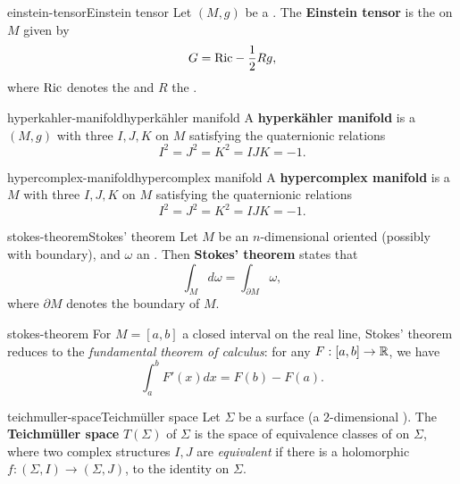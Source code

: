 \begin{topic}{einstein-tensor}{Einstein tensor}
    Let $(M, g)$ be a . The \textbf{Einstein tensor} is the  on $M$ given by
    \[ G = \textup{Ric} - \frac{1}{2} R g , \]
    where $\textup{Ric}$ denotes the  and $R$ the .
\end{topic}

\begin{topic}{hyperkahler-manifold}{hyperkähler manifold}
    A \textbf{hyperkähler manifold} is a  $(M, g)$ with three  $I, J, K$ on $M$ satisfying the quaternionic relations
    \[ I^2 = J^2 = K^2 = IJK = -1 . \]
\end{topic}

\begin{topic}{hypercomplex-manifold}{hypercomplex manifold}
    A \textbf{hypercomplex manifold} is a  $M$ with three  $I, J, K$ on $M$ satisfying the quaternionic relations
    \[ I^2 = J^2 = K^2 = IJK = -1 . \]
\end{topic}

\begin{topic}{stokes-theorem}{Stokes' theorem}
    Let $M$ be an $n$-dimensional oriented   (possibly with boundary), and $\omega$ an . Then \textbf{Stokes' theorem} states that
    \[ \int_M d \omega = \int_{\partial M} \omega , \]
    where $\partial M$ denotes the boundary of $M$.
\end{topic}

\begin{example}{stokes-theorem}
    For $M = [a, b]$ a closed interval on the real line, Stokes' theorem reduces to the \textit{fundamental theorem of calculus}: for any $F : [a, b] \to \mathbb{R}$, we have
    \[ \int_a^b F'(x) dx = F(b) - F(a) . \]
\end{example}

\begin{topic}{teichmuller-space}{Teichmüller space}
    Let $\Sigma$ be a surface (a $2$-dimensional ). The \textbf{Teichmüller space} $T(\Sigma)$ of $\Sigma$ is the space of equivalence classes of  on $\Sigma$, where two complex structures $I, J$ are \textit{equivalent} if there is a holomorphic  $f : (\Sigma, I) \to (\Sigma, J)$,  to the identity on $\Sigma$.
\end{topic}

